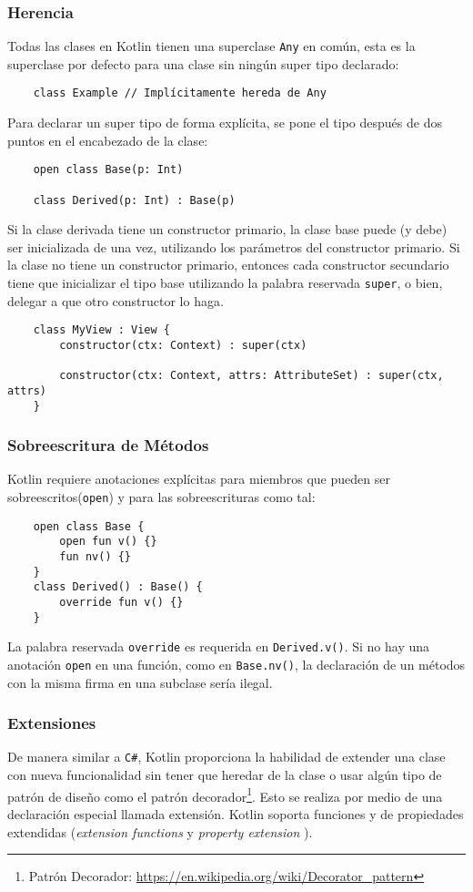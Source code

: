\subsubsection{Herencia}
Todas las clases en Kotlin tienen una superclase \texttt{Any} en común, esta es la superclase por defecto para una clase sin ningún super tipo declarado:
\begin{verbatim}
    class Example // Implícitamente hereda de Any
\end{verbatim}

Para declarar un super tipo de forma explícita, se pone el tipo después de dos puntos en el encabezado de la clase:
\begin{verbatim}
    open class Base(p: Int)
    
    class Derived(p: Int) : Base(p)
\end{verbatim}
 
Si la clase derivada tiene un constructor primario, la clase base puede (y debe) ser inicializada de una vez, utilizando los parámetros del constructor primario. Si la clase no tiene un constructor primario, entonces cada constructor secundario tiene que inicializar el tipo base utilizando la palabra reservada \texttt{super}, o bien, delegar a que otro constructor lo haga. 

\begin{verbatim}
    class MyView : View {
        constructor(ctx: Context) : super(ctx)
        
        constructor(ctx: Context, attrs: AttributeSet) : super(ctx, attrs)
    }
\end{verbatim}

\subsubsection{Sobreescritura de Métodos}
Kotlin requiere anotaciones explícitas para miembros que pueden ser sobreescritos(\texttt{open}) y para las sobreescrituras como tal:
\begin{verbatim}
    open class Base {
        open fun v() {}
        fun nv() {}
    }
    class Derived() : Base() {
        override fun v() {}
    }
\end{verbatim}

La palabra reservada \texttt{override} es requerida en \texttt{Derived.v()}. Si no hay una anotación \texttt{open} en una función, como en \texttt{Base.nv()}, la declaración de un métodos con la misma firma en una subclase sería ilegal.

\subsubsection{Extensiones}
De manera similar a \texttt{C\#}, Kotlin proporciona la habilidad de extender una clase con nueva funcionalidad sin tener que heredar de la clase o usar algún tipo de patrón de diseño como el patrón decorador\footnote{Patrón Decorador: \url{https://en.wikipedia.org/wiki/Decorator_pattern}}. Esto se realiza por medio de una declaración especial llamada extensión. Kotlin soporta funciones y de propiedades extendidas (\emph{extension functions} y \emph{property extension} ).

